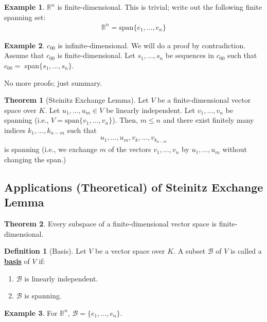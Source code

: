 \documentclass[11pt]{scrartcl}
\newcommand{\R}[0]{\mathbb{R}}
\theoremstyle{definition}
\newtheorem{theorem}{Theorem}
\newtheorem{definition}{Definition}
\newtheorem{ex}{Example}
\theoremstyle{remark}
\newcommand{\dfn}[1]{\textbf{\underline{#1}}}
\begin{document}
\begin{ex}
	$\R^n$ is finite-dimensional. This is trivial; write out the following finite spanning set: 
	\begin{align*}
		\R^n = \text{span} \{ e_1, ..., e_n \} 
	\end{align*}	
\end{ex}


\begin{ex}
	$c_{00}$ is infinite-dimensional. We will do a proof by contradiction. Assume that $c_{00}$ is finite-dimensional. Let $s_1, ..., s_n$ be sequences in $c_{00}$ such that $c_{00} =$ span$\{ s_1, ..., s_n \}$. 
\end{ex}

No more proofs; just summary. 

\begin{theorem}[Steinitz Exchange Lemma]
	Let $V$ be a finite-dimensional vector space over $K$. Let $u_1, ..., u_m \in V$ be linearly independent. Let $v_1, ..., v_n$ be spanning  (i.e., $V = \text{span} \{ v_1, ..., v_n \}$). Then, $m \leq n$ and there exist finitely many indices $k_1, ..., k_{n-m}$ such that 
	\begin{align}
		u_1, ..., u_m, v_{k},..., v_{k_{n-m}}	
	\end{align}
	is spanning (i.e., we exchange $m$ of the vectors $v_1, ..., v_n$ by $u_1, ..., u_m$ without changing the span.)
\end{theorem}

\subsection{Applications (Theoretical) of Steinitz Exchange Lemma}
\begin{theorem}
	Every subspace of a finite-dimensional vector space is finite-dimensional. 
\end{theorem}

\begin{definition}[Basis]
	Let $V$ be a vector space over $K$. A subset $\mathcal{B}$ of $V$ is called a \dfn{basis} of $V$ if: 
	\begin{enumerate}[noitemsep]
		\item $\mathcal{B}$ is linearly independent. 
		\item $\mathcal{B}$ is spanning. 
	\end{enumerate}
\end{definition}

\begin{ex}
	For $\R^n$, $\mathcal{B} = \{ e_1, ..., e_n \}$. 
\end{ex}
\end{document}
